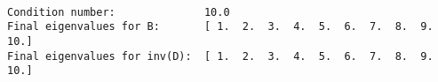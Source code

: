 \documentclass[11pt]{article}
\begin{document}
    \begin{center}
    \end{center}
    { \hspace*{\fill} \\}
    
    \begin{center}
    \end{center}
    { \hspace*{\fill} \\}
    
    \begin{center}
    \end{center}
    { \hspace*{\fill} \\}
    
    \begin{Verbatim}[commandchars=\\\{\}]
Condition number:              10.0
Final eigenvalues for B:       [ 1.  2.  3.  4.  5.  6.  7.  8.  9. 10.]
Final eigenvalues for inv(D):  [ 1.  2.  3.  4.  5.  6.  7.  8.  9. 10.]

    \end{Verbatim}

    \begin{center}
    \end{center}
    { \hspace*{\fill} \\}
    
    \begin{center}
    \end{center}
    { \hspace*{\fill} \\}
    
    \begin{center}
    \end{center}
    { \hspace*{\fill} \\}
    
\end{document}

